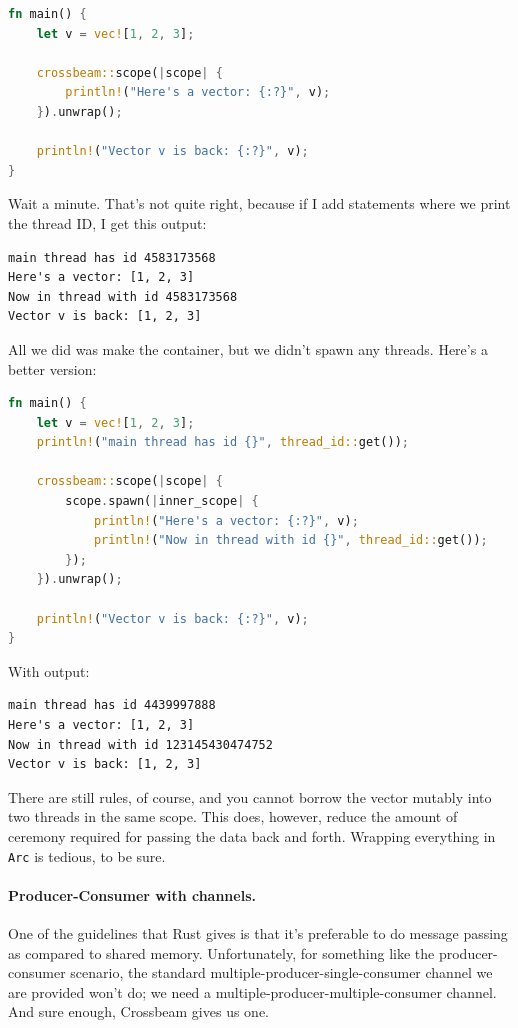 \begin{lstlisting}[language=Rust]
fn main() {
    let v = vec![1, 2, 3];

    crossbeam::scope(|scope| {
        println!("Here's a vector: {:?}", v);
    }).unwrap();

    println!("Vector v is back: {:?}", v);
}
\end{lstlisting}

Wait a minute. That's not quite right, because if I add statements where we print the thread ID, I get this output:

{\scriptsize 
\begin{verbatim}
main thread has id 4583173568
Here's a vector: [1, 2, 3]
Now in thread with id 4583173568
Vector v is back: [1, 2, 3]
\end{verbatim}
}

All we did was make the container, but we didn't spawn any threads. Here's a better version:
\begin{lstlisting}[language=Rust]
fn main() {
    let v = vec![1, 2, 3];
    println!("main thread has id {}", thread_id::get());

    crossbeam::scope(|scope| {
        scope.spawn(|inner_scope| {
            println!("Here's a vector: {:?}", v);
            println!("Now in thread with id {}", thread_id::get());
        });
    }).unwrap();

    println!("Vector v is back: {:?}", v);
}
\end{lstlisting}
With output:

{\scriptsize 
\begin{verbatim}
main thread has id 4439997888
Here's a vector: [1, 2, 3]
Now in thread with id 123145430474752
Vector v is back: [1, 2, 3]
\end{verbatim}
}

There are still rules, of course, and you cannot borrow the vector mutably into two threads in the same scope. This does, however, reduce the amount of ceremony required for passing the data back and forth. Wrapping everything in \texttt{Arc} is tedious, to be sure. 


\paragraph{Producer-Consumer with channels.} One of the guidelines that Rust gives is that it's preferable to do message passing as compared to shared memory. Unfortunately, for something like the producer-consumer scenario, the standard multiple-producer-single-consumer channel we are provided won't do; we need a multiple-producer-multiple-consumer channel. And sure enough, Crossbeam gives us one. 

